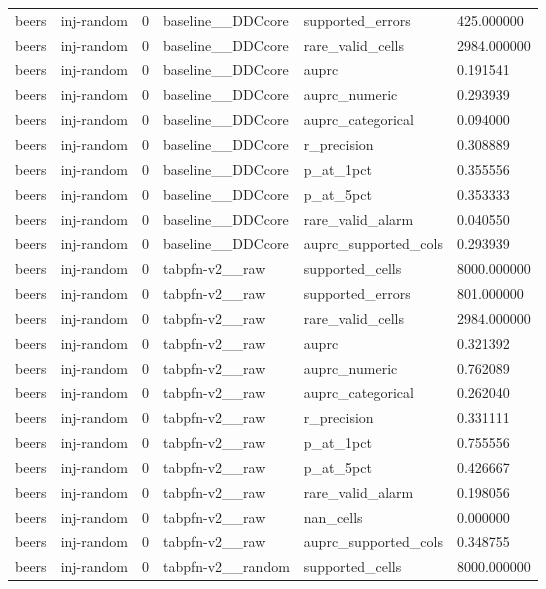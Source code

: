 \begin{tabular}{llllll}
beers & inj-random & 0 & baseline\_\_DDCcore & supported\_errors & 425.000000 \\
beers & inj-random & 0 & baseline\_\_DDCcore & rare\_valid\_cells & 2984.000000 \\
beers & inj-random & 0 & baseline\_\_DDCcore & auprc & 0.191541 \\
beers & inj-random & 0 & baseline\_\_DDCcore & auprc\_numeric & 0.293939 \\
beers & inj-random & 0 & baseline\_\_DDCcore & auprc\_categorical & 0.094000 \\
beers & inj-random & 0 & baseline\_\_DDCcore & r\_precision & 0.308889 \\
beers & inj-random & 0 & baseline\_\_DDCcore & p\_at\_1pct & 0.355556 \\
beers & inj-random & 0 & baseline\_\_DDCcore & p\_at\_5pct & 0.353333 \\
beers & inj-random & 0 & baseline\_\_DDCcore & rare\_valid\_alarm & 0.040550 \\
beers & inj-random & 0 & baseline\_\_DDCcore & auprc\_supported\_cols & 0.293939 \\
beers & inj-random & 0 & tabpfn-v2\_\_raw & supported\_cells & 8000.000000 \\
beers & inj-random & 0 & tabpfn-v2\_\_raw & supported\_errors & 801.000000 \\
beers & inj-random & 0 & tabpfn-v2\_\_raw & rare\_valid\_cells & 2984.000000 \\
beers & inj-random & 0 & tabpfn-v2\_\_raw & auprc & 0.321392 \\
beers & inj-random & 0 & tabpfn-v2\_\_raw & auprc\_numeric & 0.762089 \\
beers & inj-random & 0 & tabpfn-v2\_\_raw & auprc\_categorical & 0.262040 \\
beers & inj-random & 0 & tabpfn-v2\_\_raw & r\_precision & 0.331111 \\
beers & inj-random & 0 & tabpfn-v2\_\_raw & p\_at\_1pct & 0.755556 \\
beers & inj-random & 0 & tabpfn-v2\_\_raw & p\_at\_5pct & 0.426667 \\
beers & inj-random & 0 & tabpfn-v2\_\_raw & rare\_valid\_alarm & 0.198056 \\
beers & inj-random & 0 & tabpfn-v2\_\_raw & nan\_cells & 0.000000 \\
beers & inj-random & 0 & tabpfn-v2\_\_raw & auprc\_supported\_cols & 0.348755 \\
beers & inj-random & 0 & tabpfn-v2\_\_random & supported\_cells & 8000.000000 \\

\end{tabular}
